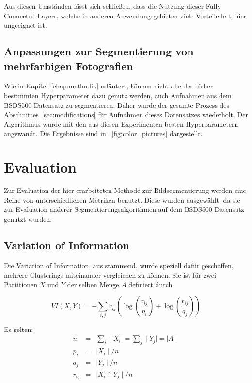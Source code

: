 Aus diesen Umständen lässt sich schließen, dass die Nutzung dieser Fully Connected Layers, welche in anderen Anwendungsgebieten viele Vorteile hat, hier ungeeignet ist.



\subsection{Anpassungen zur Segmentierung von mehrfarbigen Fotografien}
\label{exp_colorpicture_optimization}

Wie in Kapitel~\ref{chap:methodik} erläutert, können nicht alle der bisher bestimmten Hyperparameter dazu genutz werden, auch Aufnahmen aus dem BSDS500-Datensatz zu segmentieren. Daher wurde der gesamte Prozess des Abschnittes~\ref{sec:modifications} für Aufnahmen dieses Datensatzes wiederholt. Der Algorithmus wurde mit den aus diesen Experimenten besten Hyperparametern angewandt. Die Ergebnisse sind in \figurename~\ref{fig:color_pictures} dargestellt.


\section{Evaluation}
\label{sec:evaluation}

Zur Evaluation der hier erarbeiteten Methode zur Bildsegmentierung werden eine Reihe von unterschiedlichen Metriken benutzt. Diese wurden ausgewählt, da sie zur Evaluation anderer Segmentierungsalgorithmen auf dem BSDS500 Datensatz \cite{bsd500} genutzt wurden. \cite{arbelaez_10, xia_17}

\subsection{Variation of Information}

Die Variation of Information, aus \cite{meil_03} stammend, wurde speziell dafür geschaffen, mehrere Clusterings miteinander vergleichen zu können. Sie ist für zwei Partitionen $X$ und $Y$ der selben Menge $A$ definiert durch:

\begin{equation}
VI(X, Y) = -\sum_{i, j} r_{ij}\left(\log\left(\frac{r_{ij}}{p_i}\right)+\log\left(\frac{r_{ij}}{q_j}\right)\right)
\end{equation}

Es gelten:
\begin{eqnarray}
n&=&\sum_i\mid X_i\mid=\sum_j \mid Y_j\mid=\mid A\mid\\
p_i&=&\mid X_i\mid/n\\
q_j&=&\mid Y_j\mid/n\\
r_{ij}&=&\mid X_i\cap Y_j\mid/n\\
\end{eqnarray}

